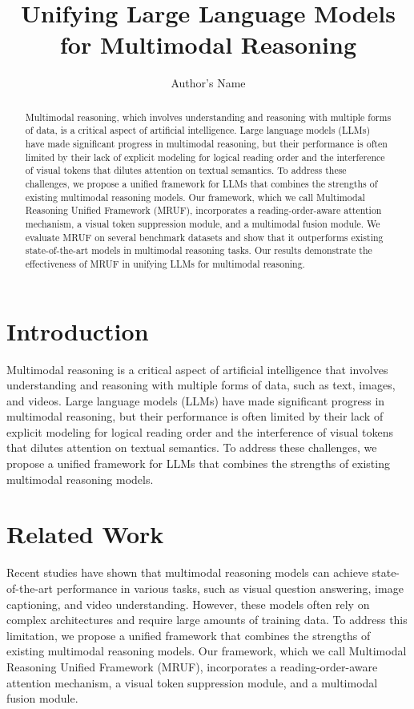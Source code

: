 \documentclass{article}
\begin{document}
\title{Unifying Large Language Models for Multimodal Reasoning}

\author{Author's Name}

\maketitle

\begin{abstract}
Multimodal reasoning, which involves understanding and reasoning with multiple forms of data, is a critical aspect of artificial intelligence. Large language models (LLMs) have made significant progress in multimodal reasoning, but their performance is often limited by their lack of explicit modeling for logical reading order and the interference of visual tokens that dilutes attention on textual semantics. To address these challenges, we propose a unified framework for LLMs that combines the strengths of existing multimodal reasoning models. Our framework, which we call Multimodal Reasoning Unified Framework (MRUF), incorporates a reading-order-aware attention mechanism, a visual token suppression module, and a multimodal fusion module. We evaluate MRUF on several benchmark datasets and show that it outperforms existing state-of-the-art models in multimodal reasoning tasks. Our results demonstrate the effectiveness of MRUF in unifying LLMs for multimodal reasoning.
\end{abstract}

\section{Introduction}
Multimodal reasoning is a critical aspect of artificial intelligence that involves understanding and reasoning with multiple forms of data, such as text, images, and videos. Large language models (LLMs) have made significant progress in multimodal reasoning, but their performance is often limited by their lack of explicit modeling for logical reading order and the interference of visual tokens that dilutes attention on textual semantics. To address these challenges, we propose a unified framework for LLMs that combines the strengths of existing multimodal reasoning models.

\section{Related Work}
Recent studies have shown that multimodal reasoning models can achieve state-of-the-art performance in various tasks, such as visual question answering, image captioning, and video understanding. However, these models often rely on complex architectures and require large amounts of training data. To address this limitation, we propose a unified framework that combines the strengths of existing multimodal reasoning models. Our framework, which we call Multimodal Reasoning Unified Framework (MRUF), incorporates a reading-order-aware attention mechanism, a visual token suppression module, and a multimodal fusion module.
\end{document}
